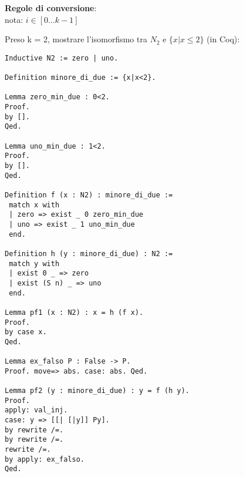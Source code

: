 \textbf{Regole di conversione}: \\

nota: $i \in [0 ... k-1]$

\begin{prooftree}
\end{prooftree}

Preso k = 2, mostrare l'isomorfismo tra $N_2$ e $\{x|x \leq 2\}$ (in Coq):

\begin{lstlisting}[language=Coq]
Inductive N2 := zero | uno.

Definition minore_di_due := {x|x<2}.

Lemma zero_min_due : 0<2.
Proof.
by [].
Qed.

Lemma uno_min_due : 1<2.
Proof.
by [].
Qed.

Definition f (x : N2) : minore_di_due :=
 match x with
 | zero => exist _ 0 zero_min_due
 | uno => exist _ 1 uno_min_due
 end.

Definition h (y : minore_di_due) : N2 :=
 match y with
 | exist 0 _ => zero
 | exist (S n) _ => uno
 end.

Lemma pf1 (x : N2) : x = h (f x).
Proof.
by case x.
Qed.

Lemma ex_falso P : False -> P.
Proof. move=> abs. case: abs. Qed.

Lemma pf2 (y : minore_di_due) : y = f (h y).
Proof.
apply: val_inj.
case: y => [[| [|y]] Py].
by rewrite /=.
by rewrite /=.
rewrite /=.
by apply: ex_falso.
Qed.
\end{lstlisting}

